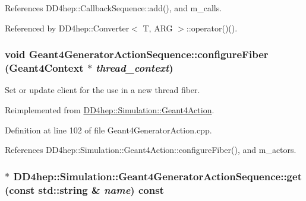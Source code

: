 References DD4hep::CallbackSequence::add(), and m\_\-calls.

Referenced by DD4hep::Converter$<$ T, ARG $>$::operator()().\hypertarget{class_d_d4hep_1_1_simulation_1_1_geant4_generator_action_sequence_a0ba4324a4f977eb12057e789eaf44f07}{
\subsubsection[{configureFiber}]{\setlength{\rightskip}{0pt plus 5cm}void Geant4GeneratorActionSequence::configureFiber ({\bf Geant4Context} $\ast$ {\em thread\_\-context})}}
\label{class_d_d4hep_1_1_simulation_1_1_geant4_generator_action_sequence_a0ba4324a4f977eb12057e789eaf44f07}


Set or update client for the use in a new thread fiber. 

Reimplemented from \hyperlink{class_d_d4hep_1_1_simulation_1_1_geant4_action_a6adc7138508303e4e417cb48a737ab19}{DD4hep::Simulation::Geant4Action}.

Definition at line 102 of file Geant4GeneratorAction.cpp.

References DD4hep::Simulation::Geant4Action::configureFiber(), and m\_\-actors.\hypertarget{class_d_d4hep_1_1_simulation_1_1_geant4_generator_action_sequence_adfb5656b40eeb07f148871e97a7d11f7}{
\subsubsection[{get}]{$\ast$ DD4hep::Simulation::Geant4GeneratorActionSequence::get (const std::string \& {\em name}) const}}
\label{class_d_d4hep_1_1_simulation_1_1_geant4_generator_action_sequence_adfb5656b40eeb07f148871e97a7d11f7}


